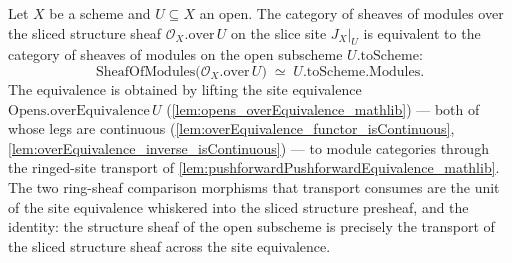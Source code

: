 \begin{definition}
  \label{def:over_restrict_equiv}
  \leanok
  Let \(X\) be a scheme and \(U \subseteq X\) an open. The category of sheaves of modules
  over the sliced structure sheaf \(\mathcal{O}_X.\mathrm{over}\,U\) on the slice site
  \(J_X|_U\) is equivalent to the category of sheaves of modules on the open subscheme
  \(U.\mathrm{toScheme}\):
  \[
    \mathrm{SheafOfModules}\bigl(\mathcal{O}_X.\mathrm{over}\,U\bigr)
    \;\simeq\; U.\mathrm{toScheme}.\mathrm{Modules}.
  \]
  The equivalence is obtained by lifting the site equivalence
  \(\mathrm{Opens.overEquivalence}\,U\) (\cref{lem:opens_overEquivalence_mathlib}) — both of
  whose legs are continuous (\cref{lem:overEquivalence_functor_isContinuous},
  \cref{lem:overEquivalence_inverse_isContinuous}) — to module categories through the
  ringed-site transport of \cref{lem:pushforwardPushforwardEquivalence_mathlib}. The two
  ring-sheaf comparison morphisms that transport consumes are the unit of the site
  equivalence whiskered into the sliced structure presheaf, and the identity: the structure
  sheaf of the open subscheme is precisely the transport of the sliced structure sheaf
  across the site equivalence.
\end{definition}


